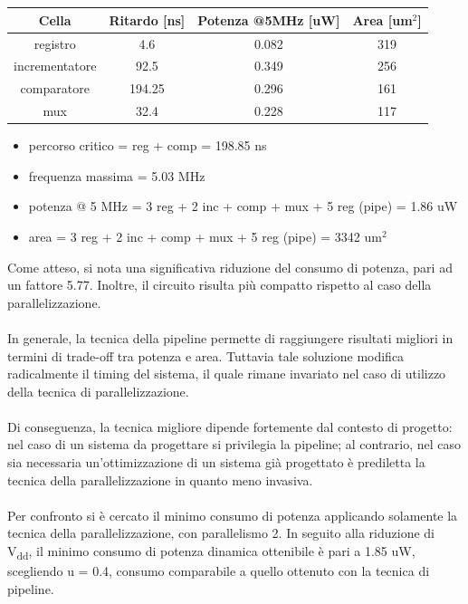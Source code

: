 \documentclass[11pt,  english, makeidx, a4paper, titlepage, oneside]{book}
\begin{document}
\\\\
\begin{center}
	\begin{tabular}{|c|c|c|c|}
	\hline
	Cella & Ritardo [ns] & Potenza @5MHz [uW] & Area [um$^2$] \\
	\hline
	 registro & 4.6 & 0.082 & 319 \\
	\hline
	 incrementatore & 92.5 & 0.349 & 256 \\
	\hline
	 comparatore & 194.25 & 0.296 & 161 \\
	\hline
	 mux & 32.4 & 0.228 & 117 \\
	\hline
	\end{tabular}	
\end{center}
\begin{itemize}
\item percorso critico = reg +  comp = 198.85 ns
\item frequenza massima = 5.03 MHz
\item potenza @ 5 MHz = 3 reg + 2 inc + comp + mux + 5 reg (pipe) = 1.86 uW
\item area = 3 reg + 2 inc + comp + mux + 5 reg (pipe) = 3342 um$^2$
\end{itemize}
\vspace{0.3cm}
Come atteso, si nota una significativa riduzione del consumo di potenza, pari ad un fattore 5.77. Inoltre, il circuito risulta più compatto rispetto al caso della parallelizzazione.
\\\\
In generale, la tecnica della pipeline permette di raggiungere risultati migliori in termini di trade-off tra potenza e area. Tuttavia tale soluzione modifica radicalmente il timing del sistema, il quale rimane invariato nel caso di utilizzo della tecnica di parallelizzazione.
\\\\
Di conseguenza, la tecnica migliore dipende fortemente dal contesto di progetto: nel caso di un sistema da progettare si privilegia la pipeline; al contrario, nel caso sia necessaria un'ottimizzazione di un sistema già progettato è prediletta la tecnica della parallelizzazione in quanto meno invasiva.
\\\\
Per confronto si è cercato il minimo consumo di potenza applicando solamente la tecnica della parallelizzazione, con parallelismo 2.  In seguito alla riduzione di V\textsubscript{dd}, il minimo consumo di potenza dinamica ottenibile è pari a 1.85 uW, scegliendo u = 0.4, consumo comparabile a quello ottenuto con la tecnica di pipeline.
\end{document}

